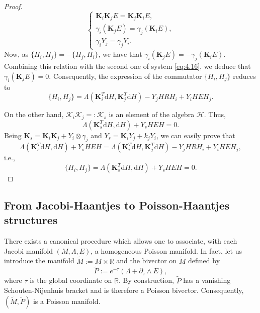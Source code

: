 \documentclass[10pt]{amsart}
\numberwithin{equation}{section}
\newcommand{\rd}{\mathrm{d}}
\newcommand{\bs}{\boldsymbol}
\theoremstyle{definition}
\begin{document}
\begin{proof}
\begin{equation} \label{eq:4.16}
\left\lbrace \begin{array}{c}
\bs{K}_{i}\bs{K}_{j}E=\bs{K}_{j}\bs{K}_{i}E,\\
\gamma_{i}(\bs{K}_{j}E)=\gamma_{j}(\bs{K}_{i}E),\\
\gamma_{i}Y_{j}=\gamma_{j}Y_{i}.
\end{array} \right. 
\end{equation}
Now, as $\lbrace H_{i},H_{j}\rbrace=-\lbrace H_{j},H_{i}\rbrace$, we have that  $\gamma_{i}(\bs{K}_{j}E)=-\gamma_{j}(\bs{K}_{i}E)$. Combining this relation with the second one of system \eqref{eq:4.16}, we deduce that $\gamma_{i}(\bs{K}_{j}E)=0$. Consequently, the expression of the commutator $\lbrace H_{i},H_{j}\rbrace$ reduces to
\begin{equation}
\lbrace H_{i},H_{j}\rbrace=\Lambda(\bs{K}_{i}^{T}\rd H,\bs{K}_{j}^{T}\rd H)-Y_{j}HRH_{i}+Y_{i}HEH_{j}.
\end{equation}

On the other hand, $\bs{\mathcal{K}}_{i}\bs{\mathcal{K}}_{j}=: \bs{\mathcal{K}}_{s}$ is an element of the algebra $\mathscr{H}$. Thus,
\begin{equation}
\Lambda(\bs{K}_{s}^{T}\rd H,\rd H)+Y_{s}HEH=0.
\end{equation}
Being $\bs{K}_{s}=\bs{K}_{i}\bs{K}_{j}+Y_{i}\otimes\gamma_{j}$ and $Y_{s}=\bs{K}_{i}Y_{j}+k_{j}Y_{i}$, we can easily prove that
\begin{equation}
\Lambda(\bs{K}_{s}^{T}\rd H,\rd H)+Y_{s}HEH=\Lambda(\bs{K}_{i}^{T}\rd H,\bs{K}_{j}^{T}\rd H)-Y_{j}HRH_{i}+Y_{i}HEH_{j},
\end{equation}
i.e.,
\begin{equation}
\lbrace H_{i},H_{j}\rbrace=\Lambda(\bs{K}_{s}^{T}\rd H,\rd H)+Y_{s}HEH=0.
\end{equation}
\end{proof}



\subsection{From Jacobi-Haantjes to Poisson-Haantjes structures}
There exists a canonical procedure which allows one to associate, with each Jacobi manifold $(M, \Lambda, E)$, a homogeneous Poisson manifold. In fact, let us introduce the manifold $\tilde{M}:= M\times \mathbb{R}$ and the bivector on $\tilde{M}$ defined by
\[
\tilde{P}:=e^{-\tau}(\Lambda+ \partial_\tau \wedge E),
\]
where $\tau$ is the global coordinate on $\mathbb{R}$. By construction, $\tilde{P}$ has a vanishing Schouten-Nijenhuis bracket and is therefore a Poisson bivector. Consequently, $(\tilde{M},\tilde{P})$ is a Poisson manifold. 
\end{document}
